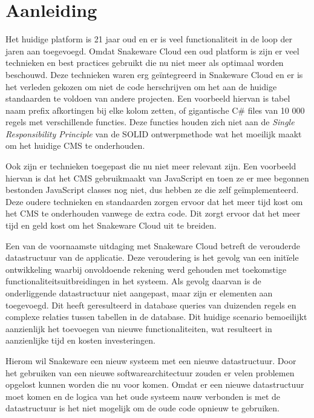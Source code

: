\section{Aanleiding}
Het huidige platform is 21 jaar oud en er is veel functionaliteit in de loop der jaren aan toegevoegd.
Omdat Snakeware Cloud een oud platform is zijn er veel technieken en best practices gebruikt die nu niet meer als optimaal worden beschouwd.
Deze technieken waren erg geïntegreerd in Snakeware Cloud en er is het verleden gekozen om niet de code herschrijven om het aan de huidige standaarden te voldoen van andere projecten.
Een voorbeeld hiervan is tabel naam prefix afkortingen bij elke kolom zetten, of gigantische C\# \Parencite{CSharp} files van 10 000 regels met verschillende functies.
Deze functies houden zich niet aan de \textit{Single Responsibility Principle} van de SOLID ontwerpmethode \Parencite{SOLID} wat het moeilijk maakt om het huidige \gls{CMS} te onderhouden.

\whitespace
Ook zijn er technieken toegepast die nu niet meer relevant zijn.
Een voorbeeld hiervan is dat het \gls{CMS} gebruikmaakt van JavaScript \Parencite{JavaScript} en toen ze er mee begonnen bestonden JavaScript classes \Parencite{JavascriptClasses} nog niet, dus hebben ze die zelf geïmplementeerd.
Deze oudere technieken en standaarden zorgen ervoor dat het meer tijd kost om het CMS te onderhouden vanwege de extra code.
Dit zorgt ervoor dat het meer tijd en geld kost om het Snakeware Cloud uit te breiden.

\whitespace[2]
Een van de voornaamste uitdaging met Snakeware Cloud betreft de verouderde datastructuur van de applicatie.
Deze veroudering is het gevolg van een initïele ontwikkeling waarbij onvoldoende rekening werd gehouden met toekomstige functionaliteitsuitbreidingen in het systeem.
Als gevolg daarvan is de onderliggende datastructuur niet aangepast, maar zijn er elementen aan toegevoegd.
Dit heeft geresulteerd in database queries van duizenden regels en complexe relaties tussen tabellen in de database.
Dit huidige scenario bemoeilijkt aanzienlijk het toevoegen van nieuwe functionaliteiten, wat resulteert in aanzienlijke tijd en kosten investeringen.

\whitespace[2]
Hierom wil Snakeware een nieuw systeem met een nieuwe datastructuur.
Door het gebruiken van een nieuwe softwarearchitectuur zouden er velen problemen opgelost kunnen worden die nu voor komen.
Omdat er een nieuwe datastructuur moet komen en de logica van het oude systeem nauw verbonden is met de datastructuur is het niet mogelijk om de oude code opnieuw te gebruiken.
